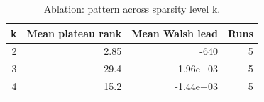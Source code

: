 \begin{table}
\caption{Ablation: pattern across sparsity level k.}
\label{tab:ablation_k}
\begin{tabular}{rrrr}
\toprule
k & Mean plateau rank & Mean Walsh lead & Runs \\
\midrule
2 & 2.85 & -640 & 5 \\
3 & 29.4 & 1.96e+03 & 5 \\
4 & 15.2 & -1.44e+03 & 5 \\
\bottomrule
\end{tabular}
\end{table}
